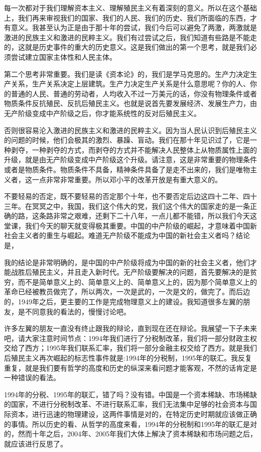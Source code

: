 \documentclass[UTF8, 12pt, a4paper]{ctexrep}
\begin{document}
每一次都对于我们理解资本主义、理解殖民主义有着深刻的意义。所以在这个基础上，我们再来审视我们的国家、我们的人民、我们的历史、我们所面临的东西，才有意义。我甚至认为正是由于那十年的尝试，我们今后可以避免了两激，两激就是激进的民族主义和激进的民粹主义。我们有过尝试之后，我们知道有些路是不能走的，这就是历史事件的重大的历史意义。这是我们做出的第一个思考，就是我们必须尝试建立国家主体性和人民主体。

第二个思考非常重要。我们是读《资本论》的，我们是学马克思的。生产力决定生产关系，生产关系决定上层建筑。生产力决定生产关系是什么意思呢？你的人、你的普通的人民、普通的劳动者，人均收入不过一万美元的话，你没有物理条件或者物质条件反抗殖民、反抗后殖民主义。也就是说首先要发展经济、发展生产力，由无产阶级变成中产阶级之后，你才能系统性的反对后殖民主义。

否则很容易沦入激进的民族主义和激进的民粹主义。因为当人民认识到后殖民主义的问题的时候，他们会极其的激烈、暴躁、盲动。我们在那十年见识过了，它是一种剥夺，一种剥夺的方式，而剥夺的方式并不能解决人民整体上从物质属性上面的升级，就是由无产阶级变成中产阶级这个升级。请注意，这是非常重要的物理条件或者是物质条件。物质条件不具备，精神条件具备了是走不出来的，我们是唯物主义者，这一点非常非常重要。所以邓小平的改革开放是有重大意义的。

不要轻易的否定，既不要轻易的否定那个十年，也不要否定后边这四十二年、四十三年。在冥冥之中，我国，我们这个伟大的党，我们这个伟大的国家走的是一条正确的路，这条路非常之艰难，还剩下二十八年，一点儿都不能错，所以我们今天这堂课，我们今天的聊天就变得极其重要。中国的中产阶级的崛起，才意味着中国新社会主义者的重生与崛起。难道无产阶级不能成为中国的新社会主义者吗？结论是，

我的结论是非常明确的，是中国的中产阶级将成为中国的新的社会主义者，他们才能战胜后殖民主义，并且走入新时代。无产阶级要解决的问题，首先要解决的是贫穷，而不是简单意义上的、简单意义上的、简单意义上的，因为那个简单意义上的革命已经被教员做完了，所以两次，一次是武的，一次是文的，做完了。而后边的，1949年之后，更主要的工作是完成物理意义上的建设。我知道很多左翼的朋友，是不同意我的看法的，慢慢讨论吧。

许多左翼的朋友一直没有终止跟我的辩论，直到现在还在辩论。我展望一下子未来吧，请大家注意时间节点：1994年我们进行了分税制改革，我们将一部分财政主权交给了西方；1995年我们联系汇率，我们将一部分金融主权交给了西方。就是我们后殖民主义再次崛起的标志性事件就是:1994年的分税制，1995年的联汇。我反复重复，就是我们要有哲学的高度和历史的纵深来看问题才能客观，不然的话肯定是一种错误的看法。

1994年的分税、1995年的联汇，错了吗？没有错。中国是一个资本稀缺、市场稀缺的国家，不进行分税制改革、不进行联系汇率，我们无法集中足够的社会资本与国际资本，进行迅速的物理建设，这两件事情是对的，在特定历史时期就应该做正确的事情。所以历史的看、从哲学的高度来看，1994年的分税制和1995年的联汇是对的，然而十年之后，2004年、2005年我们大体上解决了资本稀缺和市场问题之后，就应该进行反思了。
\end{document}
